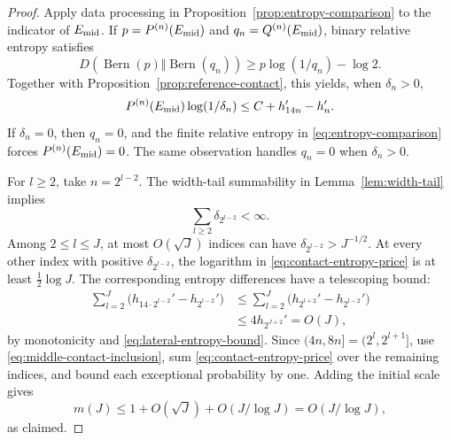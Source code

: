 \begin{proof}
Apply data processing in Proposition~\ref{prop:entropy-comparison} to
the indicator of \(E_{\rm mid}\).  If \(p=P^{(n)}(E_{\rm mid})\) and
\(q_n=Q^{(n)}(E_{\rm mid})\), binary relative entropy satisfies
\[
 D(\operatorname{Bern}(p)\Vert\operatorname{Bern}(q_n))
 \ge p\log(1/q_n)-\log2.
\]
Together with Proposition~\ref{prop:reference-contact}, this yields, when
\(\delta_n>0\),
\begin{equation}
 P^{(n)}(E_{\rm mid})\log(1/\delta_n)
 \le C+h_{14n}'-h_n'.
 \label{eq:contact-entropy-price}
\end{equation}
If \(\delta_n=0\), then \(q_n=0\), and the finite relative entropy in
\eqref{eq:entropy-comparison} forces
\(P^{(n)}(E_{\rm mid})=0\).  The same observation handles \(q_n=0\)
when \(\delta_n>0\).

For \(l\ge2\), take \(n=2^{l-2}\).  The width-tail summability in
Lemma~\ref{lem:width-tail} implies
\[
 \sum_{l\ge2}\delta_{2^{l-2}}<\infty.
\]
Among \(2\le l\le J\), at most \(O(\sqrt J)\) indices can have
\(\delta_{2^{l-2}}>J^{-1/2}\).  At every other index with positive
\(\delta_{2^{l-2}}\), the logarithm in
\eqref{eq:contact-entropy-price} is at least \(\tfrac12\log J\).
The corresponding entropy differences have a telescoping bound:
\begin{align*}
 \sum_{l=2}^J
   \bigl(h_{14\cdot2^{l-2}}'-h_{2^{l-2}}'\bigr)
 &\le\sum_{l=2}^J
   \bigl(h_{2^{l+2}}'-h_{2^{l-2}}'\bigr)\\
 &\le4h_{2^{J+2}}'=O(J),
\end{align*}
by monotonicity and \eqref{eq:lateral-entropy-bound}.  Since
\((4n,8n]=(2^l,2^{l+1}]\), use
\eqref{eq:middle-contact-inclusion}, sum
\eqref{eq:contact-entropy-price} over the remaining indices, and bound
each exceptional probability by one.  Adding the initial scale gives
\[
 m(J)\le 1+O(\sqrt J)+O(J/\log J)=O(J/\log J),
\]
as claimed.
\end{proof}
